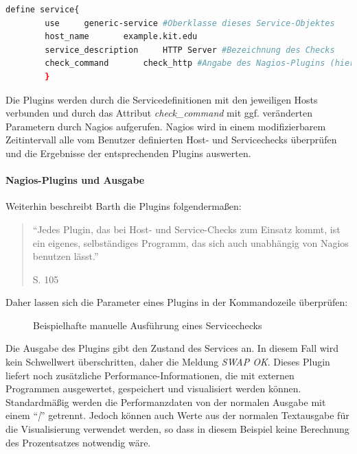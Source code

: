 \begin{lstlisting}[captionpos=b, caption=Verkürzte Definition eines Hostobjektes, label=servdef, breaklines = true, language=sh]
define service{
        use		generic-service #Oberklasse dieses Service-Objektes
        host_name		example.kit.edu
        service_description     HTTP Server #Bezeichnung des Checks
        check_command		check_http #Angabe des Nagios-Plugins (hier ohne Parameter)
        }
\end{lstlisting}

Die Plugins werden durch die Servicedefinitionen mit den jeweiligen Hosts verbunden und durch das Attribut \textit{check\_command} mit ggf. veränderten Parametern durch Nagios aufgerufen.
Nagios wird in einem modifizierbarem Zeitintervall alle vom Benutzer definierten Host- und Servicechecks überprüfen und die Ergebnisse der entsprechenden Plugins auswerten.
\paragraph{Nagios-Plugins und Ausgabe}
Weiterhin beschreibt Barth die Plugins folgendermaßen:
\begin{quote}"`Jedes Plugin, das bei Host- und Service-Checks zum Einsatz kommt, ist ein eigenes, selbständiges Programm, das sich auch unabhängig von Nagios benutzen lässt."' \begin{flushright}\cite{Barth08} S. 105\end{flushright}\end{quote} 
Daher lassen sich die Parameter eines Plugins in der Kommandozeile überprüfen:

\begin{figure}[ht]
	\centering
		\caption{Beispielhafte manuelle Ausführung eines Servicechecks}
		\label{check-swap}
\end{figure}

Die Ausgabe des Plugins gibt den Zustand des Services an.
In diesem Fall wird kein Schwellwert überschritten, daher die Meldung \textit{SWAP OK}.
Dieses Plugin liefert noch zusätzliche Performance-Informationen, die mit externen Programmen ausgewertet, gespeichert und visualisiert werden können.
Standardmäßig werden die Performanzdaten von der normalen Ausgabe mit einem "`\textit{|}"' getrennt.
Jedoch können auch Werte aus der normalen Textausgabe für die Visualisierung verwendet werden, so dass in diesem Beispiel keine Berechnung des Prozentsatzes notwendig wäre.

